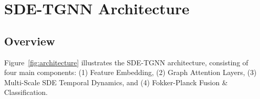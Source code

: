 \documentclass[10pt,journal,compsoc]{IEEEtran}
\begin{document}
\vspace{-0.2cm}
\section{SDE-TGNN Architecture}
\label{sec:architecture}

\vspace{-0.2cm}
\subsection{Overview}

Figure~\ref{fig:architecture} illustrates the SDE-TGNN architecture, consisting of four main components: (1) Feature Embedding, (2) Graph Attention Layers, (3) Multi-Scale SDE Temporal Dynamics, and (4) Fokker-Planck Fusion \& Classification.
\end{document}
